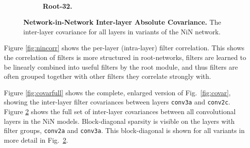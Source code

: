 \documentclass[thesis]{subfiles}
\begin{document}
{\begin{landscape}
\begin{figure}[p]
\begin{subfigure}[c]{\paperwidth}
					~
					\caption{\textbf{Root-32.}}
					\label{fig:covarroot32}
				\end{subfigure}
				\caption{\textbf{Network-in-Network Inter-layer Absolute Covariance.} The inter-layer covariance for all layers in variants of the NiN network.}
				\label{fig:suppcovariances}
			\end{figure}
		\end{landscape}
	}%
	
	Figure \ref{fig:nincorr} shows the per-layer (intra-layer) filter correlation. This shows the correlation of filters is more structured in root-networks, filters are learned to be linearly combined into useful filters by the root module, and thus filters are often grouped together with other filters they correlate strongly with.
	
	Figure \ref{fig:covarfull} shows the complete, enlarged version of Fig.~\ref{fig:covar}, showing the inter-layer filter covariances between layers \texttt{conv3a} and \texttt{conv2c}. Figure \ref{fig:suppcovariances} shows the full set of inter-layer covariances between all convolutional layers in the NiN models. Block-diagonal sparsity is visible on the layers with filter groups, \texttt{conv2a} and \texttt{conv3a}. This block-diagonal is shown for all variants in more detail in Fig.~\ref{fig:suppcovariances}.
	
\end{document}
